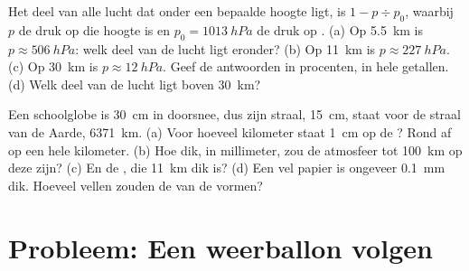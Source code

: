 \begin{exercise}[$\star\star\star$]\label{exo:g8:the-atmosphere:11}
Het deel van alle lucht dat onder een bepaalde hoogte ligt, is $1 - p \div
p_0$, waarbij $p$ de druk op die hoogte is en $p_0 =
\qty{1013}{hPa}$ de druk op . (a) Op \qty{5.5}{km} is $p
\approx \qty{506}{hPa}$: welk deel van de lucht ligt eronder? (b) Op
\qty{11}{km} is $p \approx \qty{227}{hPa}$. (c) Op \qty{30}{km} is $p \approx
\qty{12}{hPa}$. Geef de antwoorden in procenten, in hele getallen. (d) Welk
deel van de lucht ligt boven \qty{30}{km}?
\end{exercise}

\begin{exercise}[$\star\star\star$]\label{exo:g8:the-atmosphere:12}
Een schoolglobe is \qty{30}{cm} in doorsnee, dus zijn straal, \qty{15}{cm},
staat voor de straal van de Aarde, \qty{6371}{km}. (a) Voor hoeveel
kilometer staat \qty{1}{cm} op de ? Rond af op een hele kilometer.
(b) Hoe dik, in millimeter, zou de atmosfeer tot \qty{100}{km} op deze
 zijn? (c) En de , die \qty{11}{km} dik is? (d) Een vel
papier is ongeveer \qty{0.1}{mm} dik. Hoeveel vellen zouden de 
van de  vormen?
\end{exercise}

\section{Probleem: Een weerballon volgen}

